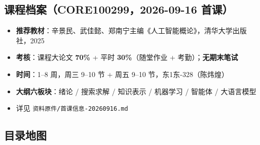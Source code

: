 \documentclass[
  chinese,
  11pt,
]{ctexart}
\providecommand{\tightlist}{%
  \setlength{\itemsep}{0pt}\setlength{\parskip}{0pt}}
\begin{document}
\subsection{课程档案（CORE100299，2026-09-16 首课）}\label{ux8bfeux7a0bux6863ux6848core1002992026-09-16-ux9996ux8bfe}

\begin{itemize}
\tightlist
\item
  \textbf{推荐教材}：辛景民、武佳懿、郑南宁主编《人工智能概论》，清华大学出版社，2025
\item
  \textbf{考核}：课程大论文 \textbf{70\%} + 平时 \textbf{30\%}（随堂作业 + 考勤）；\textbf{无期末笔试}
\item
  \textbf{时间}：1--8 周，周三 9--10 节 + 周五 9--10 节，东1东-328（陈炜煌）
\item
  \textbf{大纲六板块}：绪论 / 搜索求解 / 知识表示 / 机器学习 / 智能体 / 大语言模型
\item
  详见 \texttt{资料原件/首课信息-20260916.md}
\end{itemize}

\subsection{目录地图}\label{ux76eeux5f55ux5730ux56fe}
\end{document}
